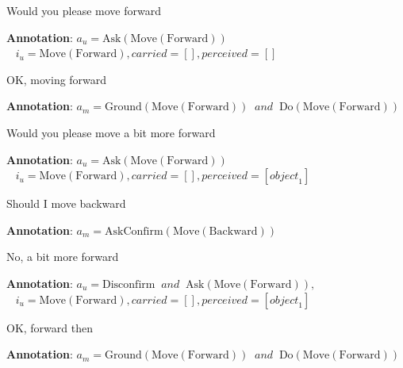 \begin{Transcript}[h]
\begin{dialogue} \vspace{3mm}
 Would you please move forward \\[1mm]
\begin{footnotesize}\textbf{Annotation}: $a_u\!=\!\mathrm{Ask(Move(Forward))}$\\ $\phantom{1}$ \hspace{16mm} $i_u\!=\!\mathrm{Move(Forward)}, \mathit{carried}\!=\![],\mathit{perceived}\!=\![]$\end{footnotesize} \vspace{2mm}
 OK, moving forward \\[1mm]
\begin{footnotesize}\textbf{Annotation}: $a_m\!=\!\mathrm{Ground(Move(Forward)) }  \ \textit{ and } \ \mathrm{ Do(Move(Forward))}$ \end{footnotesize}\vspace{2mm}
 Would you please move a bit more forward \\[1mm]
\begin{footnotesize}\textbf{Annotation}: $a_u\!=\!\mathrm{Ask(Move(Forward))}$ \\ $\phantom{1}$ \hspace{16mm} $i_u\!=\!\mathrm{Move(Forward)}, \mathit{carried}\!=\![],\mathit{perceived}\!=\![\mathit{object}_1]$\end{footnotesize}\vspace{2mm}
 Should I move backward \\[1mm]
\begin{footnotesize}\textbf{Annotation}: $a_m\!=\!\mathrm{AskConfirm(Move(Backward))}$\end{footnotesize} \vspace{2mm}
 No, a bit more forward \\[1mm]
\begin{footnotesize}\textbf{Annotation}: $a_u\!=\!\mathrm{Disconfirm } \ \textit{ and } \ \mathrm{ Ask(Move(Forward))}, $ \\ $\phantom{1}$ \hspace{16mm} $i_u\!=\!\mathrm{Move(Forward)}, \mathit{carried}\!=\![], \mathit{perceived}\!=\![\mathit{object}_1]$\end{footnotesize}\vspace{2mm}
 OK, forward then \\[1mm] 
\begin{footnotesize}\textbf{Annotation}: $a_m\!=\!\mathrm{Ground(Move(Forward)) }  \ \textit{ and } \ \mathrm{ Do(Move(Forward))}$ \end{footnotesize} \vspace{2mm}

\end{dialogue}
\end{Transcript}
